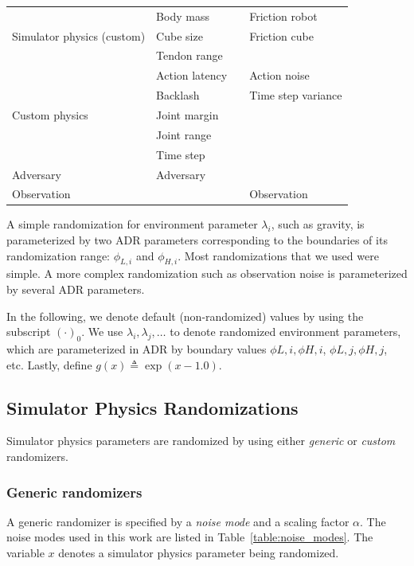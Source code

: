 \begin{table}[h]
\begin{tabular}{@{}l|l|l|l@{}}
	\midrule
	\multirow{3}{2cm}{Simulator physics (custom)}
			& Body mass &  & Friction robot \\
			& Cube size &  & Friction cube	\\
			& Tendon range &  & \\
	\midrule
	\multirow{5}{2cm}{Custom physics}
			& Action latency &  & Action noise \\
			& Backlash &  & Time step variance \\
			& Joint margin &  & \\
			& Joint range &  & \\
			& Time step & & \\
	\midrule
	Adversary & Adversary & \\
	\midrule
	Observation & & & Observation \\
        \bottomrule
    \end{tabular}
    \label{table:manipulation_randomizations}
\end{table}

A simple randomization for environment parameter $\lambda_i$, such as gravity, is parameterized by two ADR parameters corresponding to the boundaries of its randomization range: $\phi_{L, i}$ and $\phi_{H, i}$. Most randomizations that we used were simple. A more complex randomization such as observation noise is parameterized by several ADR parameters.

In the following, we denote default (non-randomized) values by using the subscript $(\cdot)_0$. We use $\lambda_i, \lambda_j, \dots$ to denote randomized environment parameters, which are parameterized in ADR by boundary values $\phi{L, i}, \phi{H, i}$, $\phi{L, j}, \phi{H, j}$, etc. Lastly, define $g(x) \triangleq \exp(x - 1.0)$.

\subsection{Simulator Physics Randomizations}\label{sec:physics_randomizations}

Simulator physics parameters are randomized by using either \emph{generic} or \emph{custom} randomizers.

\subsubsection{Generic randomizers}
A generic randomizer is specified by a \emph{noise mode} and a scaling factor $\alpha$. The noise modes used in this work are listed in Table~\ref{table:noise_modes}. The variable $x$ denotes a simulator physics parameter being randomized.

